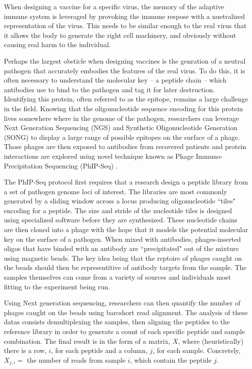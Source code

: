 \documentclass{article}
\begin{document}
When designing a vaccine for a specific virus, the memory of the adaptive immune system is leveraged by provoking the immune respose with a 
nuetralized representation of the virus.
This needs to be similar enough to the real virus that it allows the body to generate the right cell machinery,
and obviously without causing real harm to the individual.

Perhaps the largest obsticle when designing vaccines is the genration of a neutral pathogen that accurately embodies the features of the real virus.
To do this, it is often necessary to understand the molecular key -- a peptide chain -- which antibodies use to bind to the pathogen and tag it for later destruction.
Identifying this protein, often referred to as the epitope, remains a large challenge in the field. 
Knowing that the oligonucleotide sequence encoding for this protein lives somewhere where in the genome of the pathogen,
researchers can leverage Next Generation Sequencing (NGS) and Synthetic Oligonucleotide Generation (SONG)
to display a large range of possible epitopes on the surface of a phage.
Those phages are then exposed to antibodies from recovered patients and protein interactions are explored using novel technique known as 
Phage Immuno-Precipitation Sequencing (PhIP-Seq) \cite{Larman2011}.

The PhIP-Seq protocol first requires that a research design a peptide library from a set of pathogen genome loci of interest.
The libraries are most commonly generated by a sliding window across a locus producing oligonucleotide ``tiles" encoding for a peptide.
The size and stride of the nucleotide tiles is designed using specialized software before they are synthesized.
These nucleotide chains are then cloned into a phage with the hope that it models the potential molecular key on the surface of a pathogen. 
When mixed with antibodies, phages-inserted oligos that have binded with an antibody are ``precipitated" out of the mixture using magnetic beads.
The key idea being that the reptoire of phages caught on the beads should then be representitive of antibody targets from the sample.
The samples themselves can come from a variety of sources and individuals most fitting to the experiment being run. 

Using Next generation sequencing, 
researchers can then quantify the number of phages caught on the beads using barcshort read alignment. 
The analysis of these datas consists demultiplexing the samples,
then aligning the peptides to the reference library in order to generate a count of each specific peptide and sample combination. 
The final result is in the form of a matrix, $X$, where (heuristically) there is a row, $i$, for each peptide and a column, $j$, for each sample.
Concretely, $X_{j,i} =$ the number of reads from sample $i$, which contain the peptide $j$.
\end{document}
